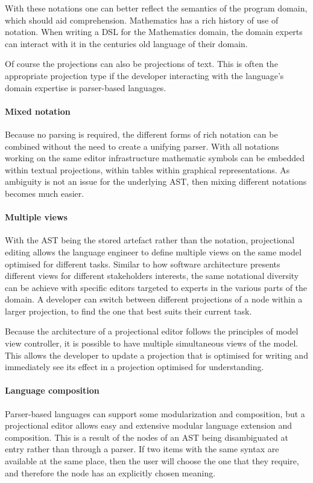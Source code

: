 With these notations one can better reflect the semantics of the program domain, which should aid comprehension.
Mathematics has a rich history of use of notation.
When writing a DSL for the Mathematics domain, the domain experts can interact with it in the centuries old language of their domain. 

Of course the projections can also be projections of text.  
This is often the appropriate projection type if the developer interacting with the language's domain expertise is parser-based languages.

\paragraph{Mixed notation}
Because no parsing is required, the different forms of rich notation can be combined without the need to create a unifying parser.
With all notations working on the same editor infrastructure mathematic symbols can be embedded within textual projections, within tables within graphical representations.
As ambiguity is not an issue for the underlying AST, then mixing different notations becomes much easier.

\paragraph{Multiple views}
With the AST being the stored artefact rather than the notation, projectional editing allows the language engineer to define multiple views on the same model optimised for different tasks.
Similar to how software architecture presents different views for different stakeholders interests, the same notational diversity can be achieve with specific editors targeted to experts in the various parts of the domain.
A developer can switch between different projections of a node within a larger projection, to find the one that best suits their current task.

Because the architecture of a projectional editor follows the principles of model view controller, it is possible to have multiple simultaneous views of the model.
This allows the developer to update a projection that is optimised for writing and immediately see its effect in a projection optimised for understanding.

\paragraph{Language composition}
Parser-based languages can support some modularization and composition, but a projectional editor allows easy and extensive modular language extension and composition.
This is a result of the nodes of an AST being disambiguated at entry rather than through a parser.
If two items with the same syntax are available at the same place, then the user will choose the one that they require, and therefore the node has an explicitly chosen meaning.


